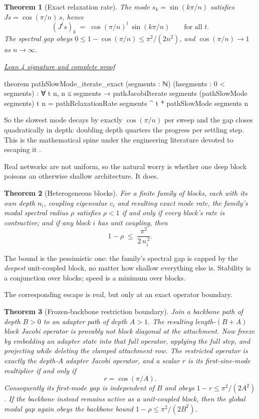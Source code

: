 \documentclass[11pt]{article}
\newtheorem{theorem}{Theorem}[section]
\newcommand{\leancommit}{647168959fc57cfe97526d9525d33e63681b8e2f}
\newcommand{\leansignaturelink}[2]{%
  \par\Needspace{0.3\textheight}\smallskip\noindent
  \href{https://github.com/zariuq/MeTTapedia/blob/\leancommit/#1\#L#2}{%
    \scriptsize\itshape Lean 4 signature and complete proof}\par\nobreak}
\begin{document}
\begin{theorem}[Exact relaxation rate]\label{thm:depth}
The mode $s_k = \sin(k\pi/n)$ satisfies $Js = \cos(\pi/n)\, s$, hence
\[
(J^t s)_k \;=\; \cos(\pi/n)^t \, \sin(k\pi/n)
\qquad\text{for all } t .
\]
The spectral gap obeys $0 \le 1 - \cos(\pi/n) \le \pi^2/(2n^2)$, and
$\cos(\pi/n) \to 1$ as $n \to \infty$.
\end{theorem}

\leansignaturelink{lean/mettapedia/Mettapedia/MachineLearning/NeuralNetworks/%
PredictiveCoding/DepthPathology.lean}{106}
\begin{leansignature}
theorem pathSlowMode_iterate_exact
    (segments : ℕ) (hsegments : 0 < segments) :
    ∀ t n, n ≤ segments →
      pathJacobiIterate segments (pathSlowMode segments) t n =
        pathRelaxationRate segments ^ t * pathSlowMode segments n
\end{leansignature}

So the slowest mode decays by exactly $\cos(\pi/n)$ per sweep and the gap closes
quadratically in depth: doubling depth quarters the progress per settling step. This is
the mathematical spine under the engineering literature devoted to escaping it
\cite{goemaere2025}.

Real networks are not uniform, so the natural worry is whether one deep block poisons an
otherwise shallow architecture. It does.

\begin{theorem}[Heterogeneous blocks]\label{thm:het}
For a finite family of blocks, each with its own depth $n_i$, coupling eigenvalue $c_i$
and resulting exact mode rate, the family's modal spectral radius $\rho$ satisfies
$\rho < 1$ if and only if every block's rate is contractive; and if any block $i$ has
unit coupling, then
\[
1 - \rho \;\le\; \frac{\pi^2}{2\,n_i^{\,2}} .
\]
\end{theorem}

The bound is the pessimistic one: the family's spectral gap is capped by the
\emph{deepest} unit-coupled block, no matter how shallow everything else is. Stability
is a conjunction over blocks; speed is a minimum over blocks.

The corresponding escape is real, but only at an exact operator boundary.

\begin{theorem}[Frozen-backbone restriction boundary]\label{cor:adapter}
Join a backbone path of depth $B>0$ to an adapter path of depth $A>1$.  The resulting
length-$(B+A)$ block Jacobi operator is provably not block diagonal at the attachment.
Now freeze by embedding an adapter state into that full operator, applying the full
step, and projecting while deleting the clamped attachment row.  The restricted
operator is exactly the depth-$A$ adapter Jacobi operator, and a scalar $r$ is its
first-sine-mode multiplier if and only if
\[
r=\cos(\pi/A).
\]
Consequently its first-mode gap is independent of $B$ and obeys
$1-r\le\pi^2/(2A^2)$.  If the backbone instead remains active as a unit-coupled block,
then the global modal gap again obeys the backbone bound
$1-\rho\le\pi^2/(2B^2)$.
\end{theorem}
\end{document}
